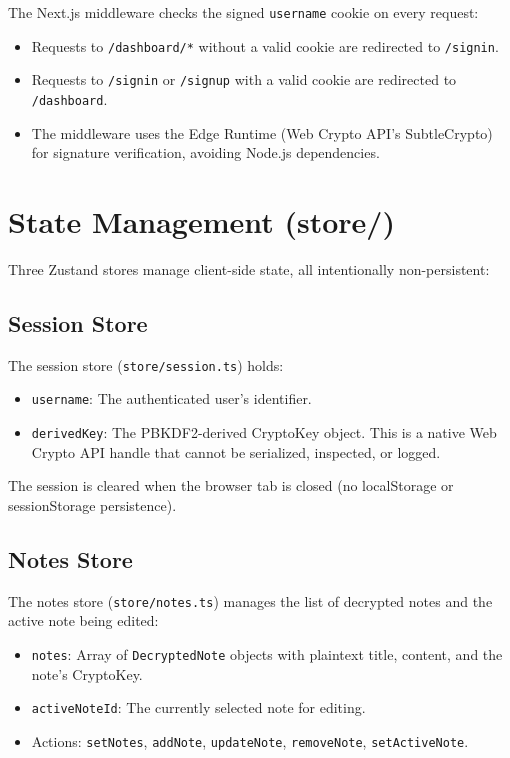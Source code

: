 The Next.js middleware checks the signed \texttt{username} cookie on every request:
\begin{itemize}
    \item Requests to \texttt{/dashboard/*} without a valid cookie are redirected to \texttt{/signin}.
    \item Requests to \texttt{/signin} or \texttt{/signup} with a valid cookie are redirected to \texttt{/dashboard}.
    \item The middleware uses the Edge Runtime (Web Crypto API's SubtleCrypto) for signature verification, avoiding Node.js dependencies.
\end{itemize}

\section{State Management (store/)}

Three Zustand stores manage client-side state, all intentionally non-persistent:

\subsection{Session Store}

The session store (\texttt{store/session.ts}) holds:
\begin{itemize}
    \item \texttt{username}: The authenticated user's identifier.
    \item \texttt{derivedKey}: The PBKDF2-derived CryptoKey object. This is a native Web Crypto API handle that cannot be serialized, inspected, or logged.
\end{itemize}

The session is cleared when the browser tab is closed (no localStorage or sessionStorage persistence).

\subsection{Notes Store}

The notes store (\texttt{store/notes.ts}) manages the list of decrypted notes and the active note being edited:
\begin{itemize}
    \item \texttt{notes}: Array of \texttt{DecryptedNote} objects with plaintext title, content, and the note's CryptoKey.
    \item \texttt{activeNoteId}: The currently selected note for editing.
    \item Actions: \texttt{setNotes}, \texttt{addNote}, \texttt{updateNote}, \texttt{removeNote}, \texttt{setActiveNote}.
\end{itemize}

